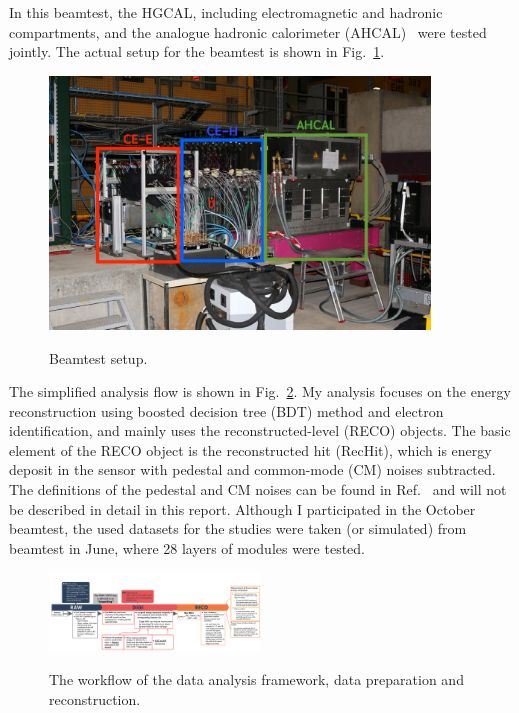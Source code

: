 In this beamtest, the HGCAL, including electromagnetic and hadronic compartments, and the analogue hadronic calorimeter (AHCAL)~\cite{collaboration:2010hb} were tested jointly. The actual setup for the beamtest is shown in Fig.~\ref{fig:Beamtest-setup}.

\begin{figure}[!ht]
    \begin{center}  
    \includegraphics[width=0.9\textwidth]{Fig/fig_HGCAL/Beamtest-Oct-setup}\\
    \caption{Beamtest setup.}
    \label{fig:Beamtest-setup}
    \end{center}
\end{figure}

The simplified analysis flow is shown in Fig.~\ref{fig:data-workflow}. My analysis focuses on the energy reconstruction using boosted decision tree (BDT) method and electron identification, and mainly uses the reconstructed-level (RECO) objects. The basic element of the RECO object is the reconstructed hit (RecHit), which is energy deposit in the sensor with pedestal and common-mode (CM) noises subtracted. The definitions of the pedestal and CM noises can be found in Ref.~\cite{1748-0221-13-10-P10023} and will not be described in detail in this report. Although I participated in the October beamtest, the used datasets for the studies were taken (or simulated) from beamtest in June, where 28 layers of modules were tested.

\begin{figure}[p]
    \begin{center}  
    \includegraphics[angle=90,width=0.5\textwidth]{Fig/fig_HGCAL/Data-analysis-framework}\\
    \caption{The workflow of the data analysis framework, data preparation and reconstruction.}
    \label{fig:data-workflow}
    \end{center}
\end{figure}

